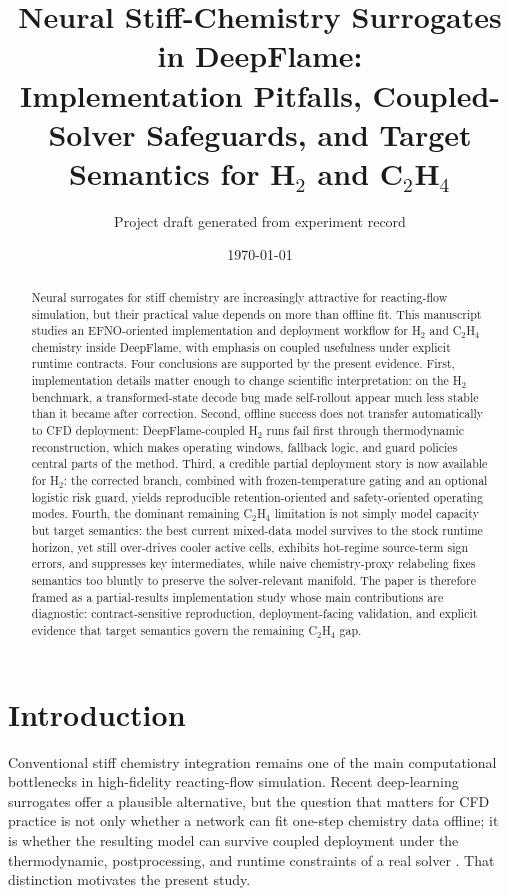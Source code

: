 \documentclass[11pt]{article}
\title{Neural Stiff-Chemistry Surrogates in DeepFlame:\\Implementation Pitfalls, Coupled-Solver Safeguards, and Target Semantics for H$_2$ and C$_2$H$_4$}
\author{Project draft generated from experiment record}
\date{\today}
\begin{document}
\maketitle

\begin{abstract}
Neural surrogates for stiff chemistry are increasingly attractive for reacting-flow simulation, but their practical value depends on more than offline fit. This manuscript studies an EFNO-oriented implementation and deployment workflow for H$_2$ and C$_2$H$_4$ chemistry inside DeepFlame, with emphasis on coupled usefulness under explicit runtime contracts. Four conclusions are supported by the present evidence. First, implementation details matter enough to change scientific interpretation: on the H$_2$ benchmark, a transformed-state decode bug made self-rollout appear much less stable than it became after correction. Second, offline success does not transfer automatically to CFD deployment: DeepFlame-coupled H$_2$ runs fail first through thermodynamic reconstruction, which makes operating windows, fallback logic, and guard policies central parts of the method. Third, a credible partial deployment story is now available for H$_2$: the corrected branch, combined with frozen-temperature gating and an optional logistic risk guard, yields reproducible retention-oriented and safety-oriented operating modes. Fourth, the dominant remaining C$_2$H$_4$ limitation is not simply model capacity but target semantics: the best current mixed-data model survives to the stock runtime horizon, yet still over-drives cooler active cells, exhibits hot-regime source-term sign errors, and suppresses key intermediates, while naive chemistry-proxy relabeling fixes semantics too bluntly to preserve the solver-relevant manifold. The paper is therefore framed as a partial-results implementation study whose main contributions are diagnostic: contract-sensitive reproduction, deployment-facing validation, and explicit evidence that target semantics govern the remaining C$_2$H$_4$ gap.
\end{abstract}

\section{Introduction}
Conventional stiff chemistry integration remains one of the main computational bottlenecks in high-fidelity reacting-flow simulation. Recent deep-learning surrogates offer a plausible alternative, but the question that matters for CFD practice is not only whether a network can fit one-step chemistry data offline; it is whether the resulting model can survive coupled deployment under the thermodynamic, postprocessing, and runtime constraints of a real solver \cite{li2025comprehensive,li2026dfodekit,wu2025nh3h2}. That distinction motivates the present study.
\end{document}
